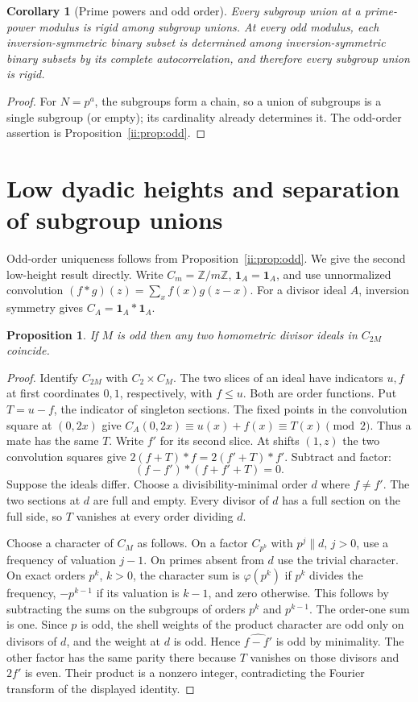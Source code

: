 \documentclass[11pt]{article}
\numberwithin{equation}{section}
\newtheorem{proposition}[theorem]{Proposition}
\newtheorem{corollary}[theorem]{Corollary}
\theoremstyle{definition}
\theoremstyle{remark}
\newcommand{\ind}{\mathbf1}
\begin{document}
\begin{corollary}[Prime powers and odd order]\label{ii:cor:primepower}
Every subgroup union at a prime-power modulus is rigid among subgroup unions.  At every odd modulus, each inversion-symmetric binary subset is determined among inversion-symmetric binary subsets by its complete autocorrelation, and therefore every subgroup union is rigid.
\end{corollary}
\begin{proof}
For $N=p^a$, the subgroups form a chain, so a union of subgroups is a single subgroup (or empty); its cardinality already determines it.  The odd-order assertion is Proposition~\ref{ii:prop:odd}.
\end{proof}




\section{Low dyadic heights and separation of subgroup unions}
Odd-order uniqueness follows from Proposition~\ref{ii:prop:odd}. We give the second low-height result directly. Write $C_m=\mathbb Z/m\mathbb Z$, $\ind_A=\mathbf1_A$, and use unnormalized convolution $(f*g)(z)=\sum_x f(x)g(z-x)$. For a divisor ideal $A$, inversion symmetry gives $C_A=\ind_A*\ind_A$.
\begin{proposition}\label{vi:prop:twice}
If $M$ is odd then any two homometric divisor ideals in $C_{2M}$ coincide.
\end{proposition}
\begin{proof}
Identify $C_{2M}$ with $C_2\times C_M$. The two slices of an ideal have indicators $u,f$ at first coordinates $0,1$, respectively, with $f\le u$. Both are order functions. Put $T=u-f$, the indicator of singleton sections. The fixed points in the convolution square at $(0,2x)$ give $C_A(0,2x)\equiv u(x)+f(x)\equiv T(x)\pmod 2$. Thus a mate has the same $T$. Write $f'$ for its second slice. At shifts $(1,z)$ the two convolution squares give $2(f+T)*f=2(f'+T)*f'$. Subtract and factor:
\[
 (f-f')*(f+f'+T)=0.
\]
Suppose the ideals differ. Choose a divisibility-minimal order $d$ where $f\ne f'$. The two sections at $d$ are full and empty. Every divisor of $d$ has a full section on the full side, so $T$ vanishes at every order dividing $d$.

Choose a character of $C_M$ as follows. On a factor $C_{p^b}$ with $p^j\parallel d$, $j>0$, use a frequency of valuation $j-1$. On primes absent from $d$ use the trivial character. On exact orders $p^k$, $k>0$, the character sum is $\varphi(p^k)$ if $p^k$ divides the frequency, $-p^{k-1}$ if its valuation is $k-1$, and zero otherwise. This follows by subtracting the sums on the subgroups of orders $p^k$ and $p^{k-1}$. The order-one sum is one. Since $p$ is odd, the shell weights of the product character are odd only on divisors of $d$, and the weight at $d$ is odd. Hence $\widehat{f-f'}$ is odd by minimality. The other factor has the same parity there because $T$ vanishes on those divisors and $2f'$ is even. Their product is a nonzero integer, contradicting the Fourier transform of the displayed identity.
\end{proof}
\end{document}
